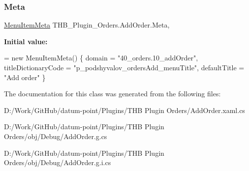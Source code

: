 \subsubsection{\texorpdfstring{Meta}{Meta}}
{\footnotesize\ttfamily \mbox{\hyperlink{class_uniform_client_1_1_plugins_1_1_menu_item_meta}{Menu\+Item\+Meta}} T\+H\+B\+\_\+\+Plugin\+\_\+\+Orders.\+Add\+Order.\+Meta\hspace{0.3cm}{\ttfamily [get]}, {\ttfamily [set]}}

{\bfseries Initial value\+:}
\begin{DoxyCode}
= \textcolor{keyword}{new} MenuItemMeta()
        \{
            domain = \textcolor{stringliteral}{"40\_orders.10\_addOrder"},
            titleDictionaryCode = \textcolor{stringliteral}{"p\_podshyvalov\_ordersAdd\_menuTitle"},
            defaultTitle = \textcolor{stringliteral}{"Add order"}
        \}
\end{DoxyCode}


The documentation for this class was generated from the following files\+:\begin{DoxyCompactItemize}
\item 
D\+:/\+Work/\+Git\+Hub/datum-\/point/\+Plugins/\+T\+H\+B Plugin Orders/Add\+Order.\+xaml.\+cs\item 
D\+:/\+Work/\+Git\+Hub/datum-\/point/\+Plugins/\+T\+H\+B Plugin Orders/obj/\+Debug/Add\+Order.\+g.\+cs\item 
D\+:/\+Work/\+Git\+Hub/datum-\/point/\+Plugins/\+T\+H\+B Plugin Orders/obj/\+Debug/Add\+Order.\+g.\+i.\+cs\end{DoxyCompactItemize}
